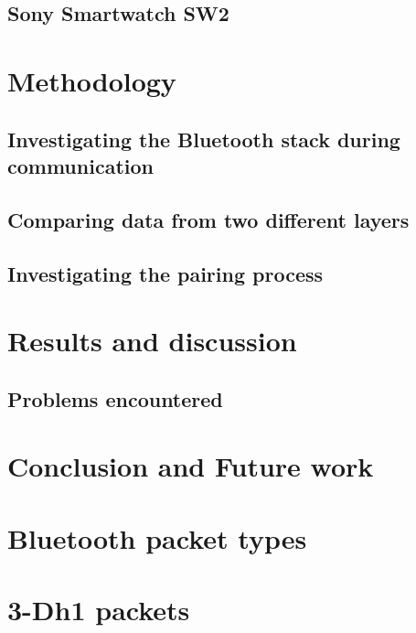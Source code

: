 \documentclass{article}
\begin{document}
	\subsection{Sony Smartwatch SW2} %
	
\newpage
\section{Methodology}		%
 
	\subsection{Investigating the Bluetooth stack during communication}
				
		
	\subsection{Comparing data from two different layers}	%
		
	
	\subsection{Investigating the pairing process}
		
\newpage
\section{Results and discussion}

		
		\newpage
		\subsection{Problems encountered}
		
\newpage
\section{Conclusion and Future work}


\newpage



{}


\appendix
\section{Bluetooth packet types}
\label{app:types}

\section{3-Dh1 packets}
\label{app:roguepackets}

\end{document}

